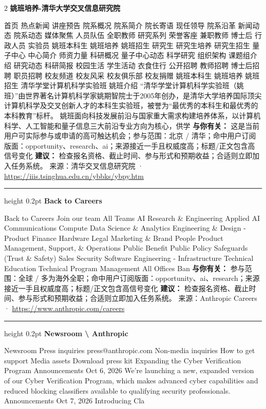 \documentclass[10.5pt]{ctexart}
\begin{document}
\begin{multicols}{2}
{\large\bfseries 姚班培养-清华大学交叉信息研究院}\par
首页 热点新闻 讲座预告 院系概况 院系简介 院长寄语 现任领导 院系沿革 新闻动态 院系动态 媒体聚焦 人员队伍 全职教师 研究系列 荣誉客座 兼职教师 博士后 行政人员 实验员 姚班本科生 姚班培养 姚班招生 研究生 研究生培养 研究生招生 量子中心 中心简介 师资力量 科研概况 量子中心动态 科学研究 组织架构 课题组介绍 研究动态 科研简报 校园生活 学生活动 衣食住行 公开招聘 教师招聘 博士后招聘 职员招聘 校友频道 校友风采 校友俱乐部 校友捐赠 姚班本科生 姚班培养 姚班招生 清华学堂计算机科学实验班 姚班介绍 “清华学堂计算机科学实验班（姚班）”由世界著名计算机科学家姚期智院士于2005年创办，是清华大学培养国际顶尖计算机科学及交叉创新人才的本科生实验班，被誉为“最优秀的本科生和最优秀的本科教育”标杆。 姚班面向科技发展前沿与国家重大需求构建培养体系，以计算机科学、人工智能和量子信息三大前沿专业方向为核心，供学
\textbf{与你有关：} 这是当前用户可实际参与或申请的高可触达机会；参与范围：北京 / 清华；命中用户订阅版面：opportunity、research、ai；来源接近一手且权威度高；标题/正文包含高信号变化
\textbf{建议：} 检查报名资格、截止时间、参与形式和预期收益；合适则立即加入任务系统。
{\footnotesize\color{ormuted} 来源：清华交叉信息研究院 · \url{https://iiis.tsinghua.edu.cn/ybbks/ybpy.htm}}
\vspace{2mm}
\hrule height 0.2pt
\vspace{2mm}
{\large\bfseries Back to Careers}\par
Back to Careers Join our team All Teams AI Research \& Engineering Applied AI Communications Compute Data Science \& Analytics Engineering \& Design - Product Finance Hardware Legal Marketing \& Brand People Product Management, Support, \& Operations Public Benefit Public Policy Safeguards (Trust \& Safety) Sales Security Software Engineering - Infrastructure Technical Education Technical Program Management All Offices Ban
\textbf{与你有关：} 参与范围：全球 / 多为海外全职；命中用户订阅版面：opportunity、ai、research；来源接近一手且权威度高；标题/正文包含高信号变化
\textbf{建议：} 检查报名资格、截止时间、参与形式和预期收益；合适则立即加入任务系统。
{\footnotesize\color{ormuted} 来源：Anthropic Careers · \url{https://www.anthropic.com/careers}}
\vspace{2mm}
\hrule height 0.2pt
\vspace{2mm}
{\large\bfseries Newsroom \textbackslash{} Anthropic}\par
Newsroom Press inquiries press@anthropic.com Non-media inquiries How to get support Media assets Download press kit Expanding the Cyber Verification Program Announcements Oct 6, 2026 We’re launching a new, expanded version of our Cyber Verification Program, which makes advanced cyber capabilities and reduced blocking classifiers available to qualifying security professionals. Announcements Oct 7, 2026 Introducing Cla

\end{multicols}
\end{document}
